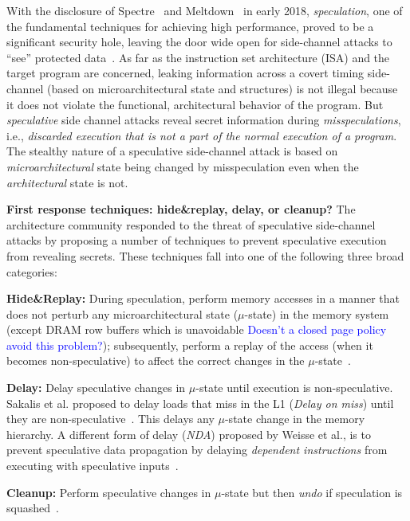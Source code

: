 With the disclosure of Spectre~\cite{kocher_spectre_2018} and Meltdown~\cite{lipp_meltdown_2018} in early 2018, \emph{speculation}, one of the fundamental techniques for achieving high
performance, proved to be a significant security hole, leaving the door wide
open for side-channel attacks to ``see'' protected data~\cite{kocher_spectre_2018,lipp_meltdown_2018}.
As far as the instruction set architecture (ISA) and the target program are
concerned, leaking information across a covert timing side-channel (based on microarchitectural state and structures) is not illegal
because it does not violate the functional, architectural behavior of the program.
But \emph{speculative} side channel attacks reveal secret information during \emph{misspeculations}, 
i.e., \emph{discarded execution that is not a part of the normal execution of a program}.
The stealthy nature of a speculative side-channel attack is based on
\emph{microarchitectural} state being changed by misspeculation even when the \emph{architectural}
state is not.

\noindent \textbf{First response techniques: hide\&replay, delay, or cleanup?}
The architecture community responded to the threat of speculative side-channel attacks by proposing a number of techniques to prevent speculative execution from revealing secrets. These techniques fall into one of the following three broad categories:
%
\squishlist
\item{\textbf{Hide\&Replay:}} During speculation, perform memory accesses in a manner that does not perturb any microarchitectural state ($\mu$-state) in the memory system (except DRAM row buffers which is unavoidable \textcolor{blue}{Doesn't a closed page policy avoid this problem?}); subsequently, perform a replay of the access (when it becomes non-speculative) to affect the correct changes in the $\mu$-state~\cite{yan_invisispec:MICRO2018,sakalis2019ghost}. 

\item{\textbf{Delay:}} Delay speculative changes in $\mu$-state until execution is non-speculative. Sakalis et al. proposed to delay loads that miss in the L1 (\emph{Delay on miss}) until they are non-speculative~\cite{sakalis2019efficient}. This delays any $\mu$-state change in the memory hierarchy. A different form of delay (\emph{NDA}) proposed by Weisse et al., is to prevent speculative data propagation by delaying \emph{dependent instructions} from executing with speculative inputs~\cite{weisse2019nda}.

\item{\textbf{Cleanup:}} Perform speculative changes in $\mu$-state but then \emph{undo} if speculation is squashed~\cite{saileshwar2019cleanupspec}.
\squishend


